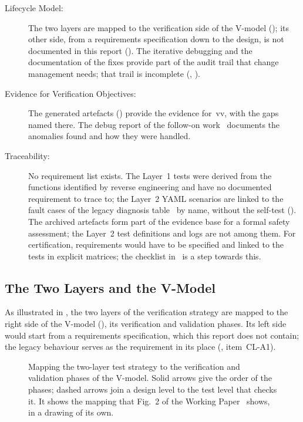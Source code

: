 \begin{description}
	\item[Lifecycle Model:] The two layers are mapped to the verification side of the V-model (); its other side, from a requirements specification down to the design, is not documented in this report (). The iterative debugging and the documentation of the fixes provide part of the audit trail that change management needs; that trail is incomplete (, ).
	\item[Evidence for Verification Objectives:] The generated artefacts () provide the evidence for~\gls{vv}, with the gaps named there. The debug report of the follow-on work~\cite[pp.~10--15]{savchuk2025} documents the anomalies found and how they were handled.
	\item[Traceability:] No requirement list exists. The Layer~1 tests were derived from the functions identified by reverse engineering and have no documented requirement to trace to; the Layer~2 YAML scenarios are linked to the fault cases of the legacy diagnosis table~\cite{rexroth1992wsp} by name, without the self-test (). The archived artefacts form part of the evidence base for a formal safety assessment; the Layer~2 test definitions and logs are not among them. For certification, requirements would have to be specified and linked to the tests in explicit matrices; the checklist in~ is a step towards this.
\end{description}

\subsection{The Two Layers and the V-Model}
\label{subsec:v_model_mapping}

As illustrated in , the two layers of the verification strategy are mapped to the right side of the V-model (), its verification and validation phases. Its left side would start from a requirements specification, which this report does not contain; the legacy behaviour serves as the requirement in its place (, item~CL-A1).

\begin{figure}[htbp]
	\centering
	
	\caption[Mapping of the Test Strategy to the V-Model]{Mapping the two-layer test strategy to the verification and validation phases of the V-model. Solid arrows give the order of the phases; dashed arrows join a design level to the test level that checks it. It shows the mapping that Fig.~2 of the Working Paper~\cite{torun2026} shows, in a drawing of its own.}
	\label{fig:v_model_mapping}
\end{figure}

